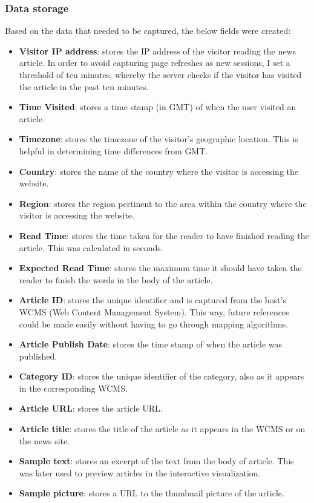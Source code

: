 \documentclass[12pt]{article}
\begin{document}
\vfill

\subsubsection{Data storage}

Based on the data that needed to be captured, the below fields were created:
\begin{itemize}
\item \textbf{Visitor IP address}: stores the IP address of the visitor reading the news article. In order to avoid capturing page refreshes as new sessions, I set a threshold of ten minutes, whereby the server checks if the visitor has visited the article in the past ten minutes.
\item \textbf{Time Visited}: stores a time stamp (in GMT) of when the user visited an article.
\item \textbf{Timezone}: stores the timezone of the visitor's geographic location. This is helpful in determining time differences from GMT.
\item \textbf{Country}: stores the name of the country where the visitor is accessing the website.
\item \textbf{Region}: stores the region pertinent to the area within the country where the visitor is accessing the website.
\item \textbf{Read Time}: stores the time taken for the reader to have finished reading the article. This was calculated in seconds.
\item \textbf{Expected Read Time}: stores the maximum time it should have taken the reader to finish the words in the body of the article.
\item \textbf{Article ID}: stores the unique identifier and is captured from the host's WCMS (Web Content Management System). This way, future references could be made easily without having to go through mapping algorithms.
\item \textbf{Article Publish Date}: stores the time stamp of when the article was published.
\item \textbf{Category ID}: stores the unique identifier of the category, also as it appears in the corresponding WCMS.
\item \textbf{Article URL}: stores the article URL. 
\item \textbf{Article title}: stores the title of the article as it appears in the WCMS or on the news site.
\item \textbf{Sample text}: stores an excerpt of the text from the body of article. This was later used to preview articles in the interactive visualization. 
\item \textbf{Sample picture}: stores a URL to the thumbnail picture of the article.

\end{itemize}
\end{document}
